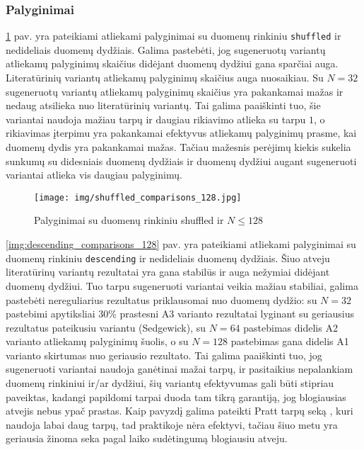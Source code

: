 \documentclass{VUMIFInfBakalaurinis}
\begin{document}
\subsubsection{Palyginimai}

\ref{img:shuffled_comparisons_128} pav. yra pateikiami atliekami palyginimai su duomenų rinkiniu \verb|shuffled| ir nedideliais duomenų dydžiais.
Galima pastebėti, jog sugeneruotų variantų atliekamų palyginimų skaičius didėjant duomenų dydžiui gana sparčiai auga.
Literatūrinių variantų atliekamų palyginimų skaičius auga nuosaikiau.
Su $N = 32$ sugeneruotų variantų atliekamų palyginimų skaičius yra pakankamai mažas ir nedaug atsilieka nuo literatūrinių variantų.
Tai galima paaiškinti tuo, šie variantai naudoja mažiau tarpų ir daugiau rikiavimo atlieka su tarpu $1$,
o rikiavimas įterpimu yra pakankamai efektyvus atliekamų palyginimų prasme, kai duomenų dydis yra pakankamai mažas.
Tačiau mažesnis perėjimų kiekis sukelia sunkumų su didesniais duomenų dydžiais ir duomenų dydžiui augant sugeneruoti variantai atlieka vis daugiau palyginimų.

\begin{figure}[H]
  \centering
  \texttt{[image: img/shuffled\_comparisons\_128.jpg]}
  \caption{Palyginimai su duomenų rinkiniu shuffled ir $N \leq 128$}
  \label{img:shuffled_comparisons_128}
\end{figure}


\ref{img:descending_comparisons_128} pav. yra pateikiami atliekami palyginimai su duomenų rinkiniu \verb|descending| ir nedideliais duomenų dydžiais.
Šiuo atveju literatūrinų variantų rezultatai yra gana stabilūs ir auga nežymiai didėjant duomenų dydžiui.
Tuo tarpu sugeneruoti variantai veikia mažiau stabiliai, galima pastebėti nereguliarius rezultatus priklausomai nuo duomenų dydžio:
su $N = 32$ pastebimi apytiksliai 30\% prastesni A3 varianto rezultatai lyginant su geriausius rezultatus pateikusiu variantu (Sedgewick),
su $N = 64$ pastebimas didelis A2 varianto atliekamų palyginimų šuolis,
o su $N = 128$ pastebimas gana didelis A1 varianto skirtumas nuo geriausio rezultato.
Tai galima paaiškinti tuo, jog sugeneruoti variantai naudoja ganėtinai mažai tarpų, ir pasitaikius nepalankiam duomenų rinkiniui ir/ar dydžiui,
šių variantų efektyvumas gali būti stipriau paveiktas, kadangi papildomi tarpai duoda tam tikrą garantiją, jog blogiausias atvejis nebus ypač prastas.
Kaip pavyzdį galima pateikti Pratt tarpų seką \cite{pratt1972shellsort}, kuri naudoja labai daug tarpų, tad praktikoje nėra efektyvi, tačiau
šiuo metu yra geriausia žinoma seka pagal laiko sudėtingumą blogiausiu atveju.
\end{document}
